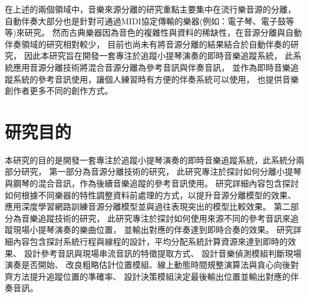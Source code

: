 \documentclass[class=NCU_thesis, crop=false]{standalone}
\begin{document}
在上述的兩個領域中，音樂來源分離的研究重點主要集中在流行樂音源的分離，
自動伴奏大部分也是針對可通過MIDI協定傳輸的樂器(例如：電子琴、電子鼓等等)來研究。
然而古典樂器因為音色的複雜性與資料的稀缺性，在音源分離與自動伴奏領域的研究相對較少，
目前也尚未有將音源分離的結果結合於自動伴奏的研究，
因此本研究旨在開發一套專注於追蹤小提琴演奏的即時音樂追蹤系統，
此系統應用音源分離技術將混合音源分離為參考音訊與伴奏音訊，
並作為即時音樂追蹤系統的參考音訊使用，讓個人練習時有方便的伴奏系統可以使用，
也提供音樂創作者更多不同的創作方式。

\pagebreak

\section{研究目的}

本研究的目的是開發一套專注於追蹤小提琴演奏的即時音樂追蹤系統，此系統分兩部分研究，
第一部分為音源分離技術的研究，
此研究專注於探討如何分離小提琴與鋼琴的混合音訊，作為後續音樂追蹤的參考音訊使用。
研究詳細內容包含探討如何根據不同樂器的特性調整資料前處理的方式，以提升音源分離模型的效果、
應用深度學習網路訓練音源分離模型並與過往表現突出的模型比較效果。
第二部分為音樂追蹤技術的研究，
此研究專注於探討如何使用來源不同的參考音訊來追蹤現場小提琴演奏的樂曲位置，
並輸出對應的伴奏達到即時合奏的效果。
研究詳細內容包含探討系統行程與線程的設計，平均分配系統計算資源來達到即時的效果、
設計參考音訊與現場串流音訊的特徵提取方式、
設計音樂偵測模組判斷現場演奏是否開始、
改良粗略估計位置模組、線上動態時間規整演算法與貪心向後對齊方法提升追蹤位置的準確率、
設計決策模組決定最後輸出位置並輸出對應的伴奏音訊。
\end{document}
